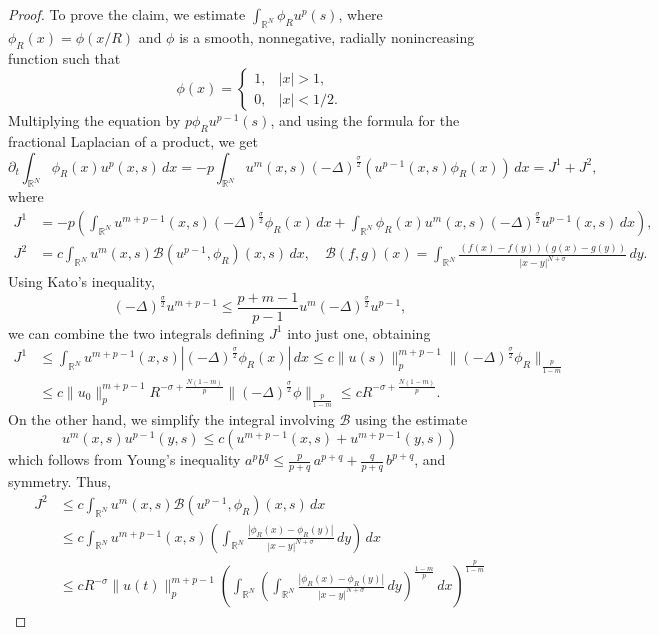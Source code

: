 \documentclass[10pt,a4paper]{amsart}
\begin{document}
\begin{proof}
To prove the claim, we estimate $\displaystyle\int_{\mathbb{R}^N}\phi_Ru^p(s)$, where $\phi_R(x)=\phi(x/R)$ and $\phi$ is a smooth, nonnegative, radially nonincreasing function such that
\[
    \phi(x)=
    \begin{cases}
        1, & |x|>1,\\
        0, & |x|<1/2.
    \end{cases}
\]
Multiplying the equation by $p\phi_R u^{p-1}(s)$, and using the formula for the fractional Laplacian of a product, we get 
$$    \partial_t\int_{\mathbb{R}^N}\phi_R(x)u^p(x,s)\,dx
    =-p\int_{\mathbb{R}^N} u^m(x,s)(-\Delta)^{\frac\sigma2}(u^{p-1}(x,s)\phi_R(x))\,dx=J^1+J^2,
$$
where
\begin{align*}
    J^1&
    =-p\left(\int_{\mathbb{R}^N} u^{m+p-1}(x,s)(-\Delta)^{\frac\sigma2}\phi_R(x)\,dx+\int_{\mathbb{R}^N}\phi_R(x)u^m(x,s)(-\Delta)^{\frac\sigma2}u^{p-1}(x,s)\,dx\right),
    \\
    J^2&=c\int_{\mathbb{R}^N}u^m(x,s)\mathcal{B}(u^{p-1},\phi_R)(x,s)\,dx,\quad
    \mathcal{B}(f,g)(x)=\int_{\mathbb{R}^N}\frac{(f(x)-f(y))(g(x)-g(y))}{|x-y|^{N+\sigma}}\,dy.
\end{align*}
Using Kato’s inequality,
$$
    (-\Delta)^{\frac\sigma2}u^{m+p-1}\le \frac{p+m-1}{p-1} u^m(-\Delta)^{\frac\sigma2}u^{p-1},
$$
we can combine the two integrals defining $J^1$ into just one, obtaining
\begin{align*}
    J^1&\le\int_{\mathbb{R}^N} u^{m+p-1}(x,s)|(-\Delta)^{\frac\sigma2}\phi_R(x)|\,dx 
    \le c\|u(s)\|_p^{m+p-1}\|(-\Delta)^{\frac\sigma2}\phi_R\|_{\frac p{1-m}}
    \\&
    \le c\|u_0\|_p^{m+p-1}R^{-\sigma+\frac{N(1-m)}{p}}\|(-\Delta)^{\frac\sigma2}\phi\|_{\frac p{1-m}}\le cR^{-\sigma+\frac{N(1-m)}{p}}.
\end{align*}
On the other hand,  we simplify the integral involving $\mathcal{B}$ using the estimate
$$
    u^m(x,s)u^{p-1}(y,s)\le c \left(u^{m+p-1}(x,s)+u^{m+p-1}(y,s)\right)
$$
which follows from Young’s inequality $a^p b^q \le \frac{p}{p+q}\, a^{p+q} + \frac{q}{p+q}\, b^{p+q}$, and symmetry. Thus,
\begin{align*}
J^2&\le c\int_{\mathbb{R}^N}u^m(x,s)\mathcal{B}(u^{p-1},\phi_R)(x,s)\,dx \\ &\le c
\int_{\mathbb{R}^N}u^{m+p-1}(x,s)\left(\int_{\mathbb{R}^N}\frac{|\phi_R(x)-\phi_R(y)|}{|x-y|^{N+\sigma}}\,dy\right)\,dx
\\&
 \leq cR^{-\sigma}\|u(t)\|_p^{m+p-1}\left(\int_{\mathbb{R}^N}\left( \int_{\mathbb{R}^N}\frac{|\phi_R(x)-\phi_R(y)|}{|x-y|^{N+\sigma}}\,dy\right)^{\frac{1-m}{p}}\,dx\right)^{\frac p{1-m}}

\end{align*}
\end{proof}
\end{document}

